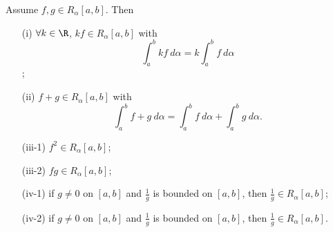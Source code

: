 \begin{theorem}
    Assume \( f,g \in {R}_{\alpha}[a,b] \). Then
    \begin{enumerate}
        \item[(i)] \( \forall k \in \R  \), \( kf \in {R}_{\alpha}[a,b] \) with \[ \int_{ a }^{ b }  kf  \ d \alpha = k \int_{ a }^{ b }  f  \ d \alpha \];
        \item[(ii)] \( f + g \in {R}_{\alpha}[a,b] \) with 
            \[  \int_{ a }^{ b }  f + g  \ d \alpha = \int_{ a }^{ b }  f  \ d \alpha  + \int_{ a }^{ b }  g  \ d \alpha. \]
        \item[(iii-1)]  \( f^{2} \in {R}_{\alpha}[a,b] \);
        \item[(iii-2)] \( fg \in {R}_{\alpha}[a,b] \);
        \item[(iv-1)] if \( g \neq 0  \) on \( [a,b] \) and \( \frac{ 1 }{ g }  \) is bounded on \( [a,b] \), then \( \frac{ 1 }{ g }  \in {R}_{\alpha}[a,b] \);
        \item[(iv-2)] if \( g \neq 0  \) on \( [a,b] \) and \( \frac{ 1 }{ g }   \) is bounded on \( [a,b] \), then \( \frac{ 1 }{ g }  \in {R}_{\alpha}[a,b] \).
    \end{enumerate}
\end{theorem}




